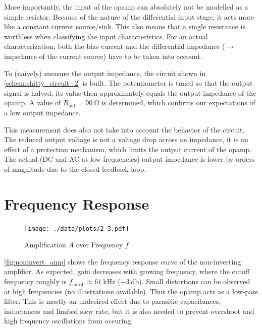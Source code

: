 More importantly, the input of the opamp can absolutely not be modelled as a simple resistor.
Because of the nature of the differential input stage, it acts more like a constant current source/sink.
This also means that a single resistance is worthless when classifying the input characteristics.	%
For an actual characterization, both the bias current and the differential impedance ($\rightarrow$ impedance of the current source) have to be taken into account.

To (naively) measure the output impedance, the circuit shown in \autoref{schem:shitty_circuit_2} is built.
The potentiometer is tuned so that the output signal is halved, its value then approximately equals the output impedance of the opamp.
A value of $R_\text{out}=\SI{90}{\ohm}$ is determined, which confirms our expectations of a low output impedance.

This measurement does also not take into account the behavior of the circuit.
The reduced output voltage is not a voltage drop across an impedance, it is an effect of a protection mechanism, which limits the output current of the opamp.
The actual (DC and AC at low frequencies) output impedance is lower by orders of magnitude due to the closed feedback loop.

\section{Frequency Response}
\begin{figure}[tbp]
	\centering
	\texttt{[image: ./data/plots/2\_3.pdf]}
	\caption[Frequency Response of Non-Inverting Amplifier]{Amplification $A$ over Frequency $f$}
	\label{fig:noninvert_amp}
\end{figure}

\autoref{fig:noninvert_amp} shows the frequency response curve of the non-inverting amplifier.
As expected, gain decreases with growing frequency, where the cutoff frequency roughly is $f_\text{cutoff}\approx\SI{61}{\kilo\hertz}$ ($\SI{-3}{\decibel}$).
Small distortions can be observed at high frequencies (no illustrations available).
Thus the opamp acts as a low-pass filter.
This is mostly an undesired effect due to parasitic capacitances, inductances and limited slew rate, but it is also needed to prevent overshoot and high frequency oscillations from occuring.
